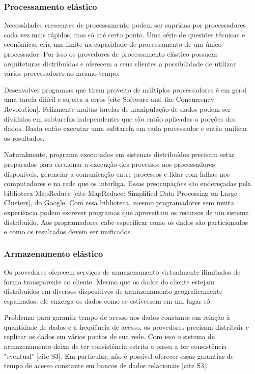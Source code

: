 \subsubsection{Processamento elástico}

Necessidades crescentes de processamento podem ser supridas por processadores cada vez mais rápidos, mas só até certo ponto. Uma série de questões técnicas e econômicas cria um limite na capacidade de processamento de um único processador. Por isso os provedores de processamento elástico possuem arquiteturas distribuídas e oferecem a seus clientes a possibilidade de utilizar vários processadores ao mesmo tempo.


Desenvolver programas que tirem proveito de múltiplos processadores é em geral uma tarefa difícil e sujeita a erros [cite Software and the Concurrency Revolution]. Felizmente muitas tarefas de manipulação de dados podem ser divididas em subtarefas independentes que são então aplicadas a porções dos dados. Basta então executar uma subtarefa em cada processador e então unificar os resultados. 

Naturalmente, programa executados em sistemas distribuídos precisam estar preparados para escalonar a execução dos processos nos processadores disponíveis, gerenciar a comunicação entre processos e lidar com falhas nos computadores e na rede que os interliga. Essas preocupações são endereçadas pela biblioteca MapReduce [cite MapReduce: Simplified Data Processing on Large Clusters], do Google. Com essa biblioteca, mesmo programadores sem muita experiência podem escrever programas que aproveitam os recursos de um sistema distribuído. Aos programadores cabe especificar como os dados são particionados e como os resultados devem ser unificados.

\subsubsection{Armazenamento elástico}
Os provedores oferecem serviços de armazenamento virtualmente ilimitados de forma transparente ao cliente. Mesmo que os dados do cliente estejam distribuídos em diversos dispositivos de armazenamento geograficamente espalhados, ele enxerga os dados como se estivessem em um lugar só.

Problema: para garantir tempo de acesso aos dados constante em relação à quantidade de dados e à freqüência de acesso, os provedores precisam distribuir e replicar os dados em vários pontos de sua rede. Com isso o sistema de armazenamento deixa de ter consistência estrita e passa a ter consistência "eventual" [cite S3]. Em particular, não é possível oferecer essas garantias de tempo de acesso constante em bancos de dados relacionais [cite S3].

